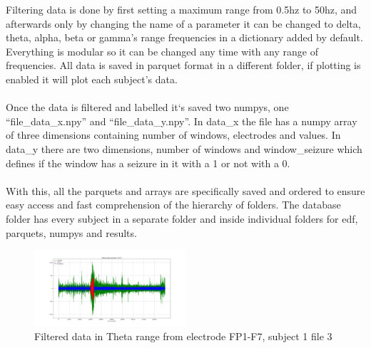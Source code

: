 Filtering data is done by first setting a maximum range from 0.5hz to 50hz, and afterwards only by changing the name of a parameter it can be changed to delta, theta, alpha, beta or gamma’s range frequencies in a dictionary added by default. Everything is modular so it can be changed any time with any range of frequencies. All data is saved in parquet format in a different folder, if plotting is enabled it will plot each subject’s data.
\\\\
Once the data is filtered and labelled it`s saved two numpys, one “file\_data\_x.npy” and “file\_data\_y.npy”. In data\_x the file has a numpy array of three dimensions containing number of windows, electrodes and values. In data\_y there are two dimensions, number of windows and window\_seizure which defines if the window has a seizure in it with a 1 or not with a 0. 
\\\\
With this, all the parquets and arrays are specifically saved and ordered to ensure easy access and fast comprehension of the hierarchy of folders. The database folder has every subject in a separate folder and inside individual folders for edf, parquets, numpys and results.
\\
\begin{figure}[h!]
    \caption{Filtered data in Theta range from electrode FP1-F7, subject 1 file 3}
    \centering
    \includegraphics[width=0.5\textwidth]{img/all in one.png}
\end{figure}

\leavevmode\\
